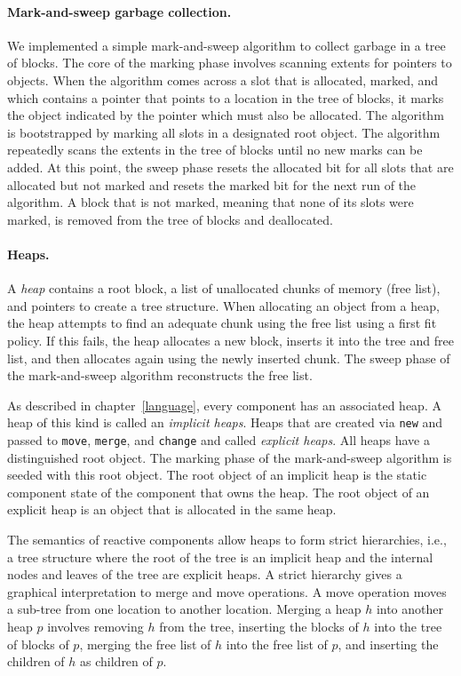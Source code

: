 \paragraph{Mark-and-sweep garbage collection.}
We implemented a simple mark-and-sweep algorithm to collect garbage in a tree of blocks.
The core of the marking phase involves scanning extents for pointers to objects.
When the algorithm comes across a slot that is allocated, marked, and which contains a pointer that points to a location in the tree of blocks, it marks the object indicated by the pointer which must also be allocated.
The algorithm is bootstrapped by marking all slots in a designated root object.
The algorithm repeatedly scans the extents in the tree of blocks until no new marks can be added.
At this point, the sweep phase resets the allocated bit for all slots that are allocated but not marked and resets the marked bit for the next run of the algorithm.
A block that is not marked, meaning that none of its slots were marked, is removed from the tree of blocks and deallocated.

\paragraph{Heaps.}
A \emph{heap} contains a root block, a list of unallocated chunks of memory (free list), and pointers to create a tree structure.
When allocating an object from a heap, the heap attempts to find an adequate chunk using the free list using a first fit policy.
If this fails, the heap allocates a new block, inserts it into the tree and free list, and then allocates again using the newly inserted chunk.
The sweep phase of the mark-and-sweep algorithm reconstructs the free list.

As described in chapter~\ref{language}, every component has an associated heap.
A heap of this kind is called an \emph{implicit heaps}.
Heaps that are created via \verb+new+ and passed to \verb+move+, \verb+merge+, and \verb+change+ and called \emph{explicit heaps}.
All heaps have a distinguished root object.
The marking phase of the mark-and-sweep algorithm is seeded with this root object.
The root object of an implicit heap is the static component state of the component that owns the heap.
The root object of an explicit heap is an object that is allocated in the same heap.

The semantics of reactive components allow heaps to form strict hierarchies, i.e., a tree structure where the root of the tree is an implicit heap and the internal nodes and leaves of the tree are explicit heaps.
A strict hierarchy gives a graphical interpretation to merge and move operations.
A move operation moves a sub-tree from one location to another location.
 Merging a heap $h$ into another heap $p$ involves removing $h$ from the tree, inserting the blocks of $h$ into the tree of blocks of $p$, merging the free list of $h$ into the free list of $p$, and inserting the children of $h$ as children of $p$.

